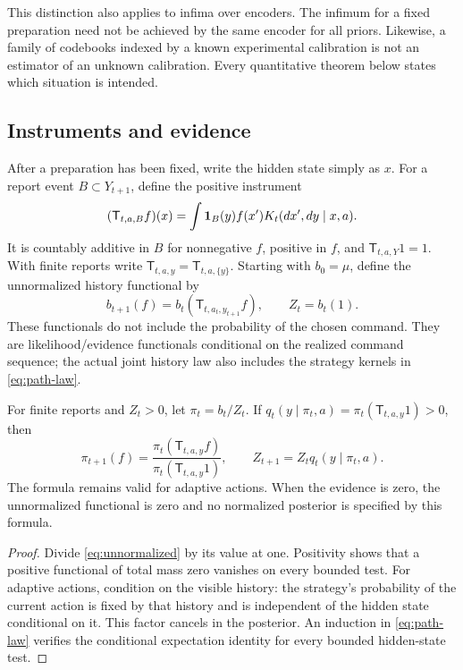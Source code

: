 This distinction also applies to infima over encoders. The infimum for a
fixed preparation need not be achieved by the same encoder for all priors.
Likewise, a family of codebooks indexed by a known experimental calibration
is not an estimator of an unknown calibration. Every quantitative theorem
below states which situation is intended.

\subsection{Instruments and evidence}
After a preparation has been fixed, write the hidden state simply as $x$.
For a report event $B\subset Y_{t+1}$, define the positive instrument
\[
 (\mathsf T_{t,a,B}f)(x)
 =\int \mathbf 1_B(y)f(x')K_t(dx',dy\mid x,a).
\]
It is countably additive in $B$ for nonnegative $f$, positive in $f$, and
$\mathsf T_{t,a,Y}1=1$. With finite reports write
$\mathsf T_{t,a,y}=\mathsf T_{t,a,\{y\}}$.
Starting with $b_0=\mu$, define the unnormalized history functional by
\begin{equation}\label{eq:unnormalized}
 b_{t+1}(f)=b_t(\mathsf T_{t,a_t,y_{t+1}}f),
 \qquad Z_t=b_t(1).
\end{equation}
These functionals do not include the probability of the chosen command.
They are likelihood/evidence functionals conditional on the realized
command sequence; the actual joint history law also includes the strategy
kernels in \eqref{eq:path-law}.

\begin{proposition}\label{prop:bayes}
For finite reports and $Z_t>0$, let $\pi_t=b_t/Z_t$. If
$q_t(y\mid\pi_t,a)=\pi_t(\mathsf T_{t,a,y}1)>0$, then
\begin{equation}\label{eq:bayes}
 \pi_{t+1}(f)=
 \frac{\pi_t(\mathsf T_{t,a,y}f)}
      {\pi_t(\mathsf T_{t,a,y}1)},
 \qquad
 Z_{t+1}=Z_tq_t(y\mid\pi_t,a).
\end{equation}
The formula remains valid for adaptive actions. When the evidence is zero,
the unnormalized functional is zero and no normalized posterior is specified
by this formula.
\end{proposition}
\begin{proof}
Divide \eqref{eq:unnormalized} by its value at one. Positivity shows that a
positive functional of total mass zero vanishes on every bounded test.
For adaptive actions, condition on the visible history: the strategy's
probability of the current action is fixed by that history and is independent
of the hidden state conditional on it. This factor cancels in the posterior.
An induction in \eqref{eq:path-law} verifies the conditional expectation
identity for every bounded hidden-state test.
\end{proof}


